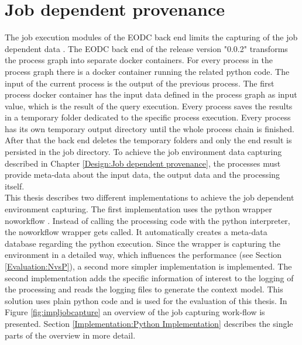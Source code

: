 \documentclass[draft,final]{vutinfth} %
\begin{document}
\section{Job dependent provenance}\label{Implementation:Job dependent provenance}
The job execution modules of the EODC back end limits the capturing of the job dependent data . The EODC back end of the release version "0.0.2" transforms the process graph into separate docker containers. For every process in the process graph there is a docker container running the related python code. The input of the current process is the output of the previous process. The first process docker container has the input data defined in the process graph as input value, which is the result of the query execution. Every process saves the results in a temporary folder dedicated to the specific process execution. Every process has its own temporary output directory until the whole process chain is finished. After that the back end deletes the temporary folders and only the end result is persisted in the job directory.
To achieve the job environment data capturing described in Chapter \ref{Design:Job dependent provenance}, the processes must provide meta-data about the input data, the output data and the processing itself. \\ 
This thesis describes two different implementations to achieve the job dependent environment capturing. The first implementation uses the python wrapper noworkflow \cite{c9e0604becba42af96a9cb0a6f60018b}. Instead of calling the processing code with the python interpreter, the noworkflow wrapper gets called. It automatically creates a meta-data database regarding the python execution. Since the wrapper is capturing the environment in a detailed way, which influences the performance (see Section \ref{Evaluation:NvsP}), a second more simpler implementation is implemented. The second implementation adds the specific information of interest to the logging of the processing and reads the logging files to generate the context model. This solution uses plain python code and is used for the evaluation of this thesis. In Figure \ref{fig:impljobcapture} an overview of the job capturing work-flow is presented. Section \ref{Implementation:Python Implementation} describes the single parts of the overview in more detail.  
\end{document}
